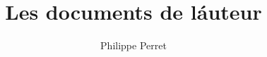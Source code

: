 \documentclass[11pt,french,twoside,a5paper]{book}
\title{Les documents de l\'auteur}
\author{Philippe Perret}
\begin{document}
\maketitle

\tableofcontents

\renewcommand{\bibname}{Filmographie}

\printindex
\end{document}
